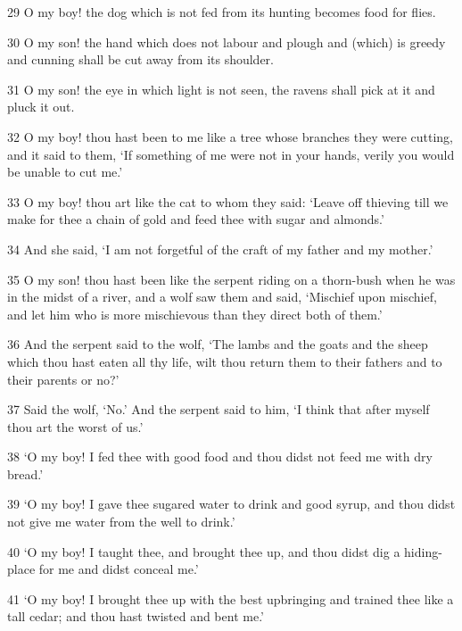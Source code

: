 \par 29 O my boy! the dog which is not fed from its hunting becomes food for flies.

\par 30 O my son! the hand which does not labour and plough and (which) is greedy and cunning shall be cut away from its shoulder.

\par 31 O my son! the eye in which light is not seen, the ravens shall pick at it and pluck it out.

\par 32 O my boy! thou hast been to me like a tree whose branches they were cutting, and it said to them, ‘If something of me were not in your hands, verily you would be unable to cut me.’

\par 33 O my boy! thou art like the cat to whom they said: ‘Leave off thieving till we make for thee a chain of gold and feed thee with sugar and almonds.’

\par 34 And she said, ‘I am not forgetful of the craft of my father and my mother.’

\par 35 O my son! thou hast been like the serpent riding on a thorn-bush when he was in the midst of a river, and a wolf saw them and said, ‘Mischief upon mischief, and let him who is more mischievous than they direct both of them.’

\par 36 And the serpent said to the wolf, ‘The lambs and the goats and the sheep which thou hast eaten all thy life, wilt thou return them to their fathers and to their parents or no?’

\par 37 Said the wolf, ‘No.’ And the serpent said to him, ‘I think that after myself thou art the worst of us.’

\par 38 ‘O my boy! I fed thee with good food and thou didst not feed me with dry bread.’

\par 39 ‘O my boy! I gave thee sugared water to drink and good syrup, and thou didst not give me water from the well to drink.’

\par 40 ‘O my boy! I taught thee, and brought thee up, and thou didst dig a hiding-place for me and didst conceal me.’

\par 41 ‘O my boy! I brought thee up with the best upbringing and trained thee like a tall cedar; and thou hast twisted and bent me.’

